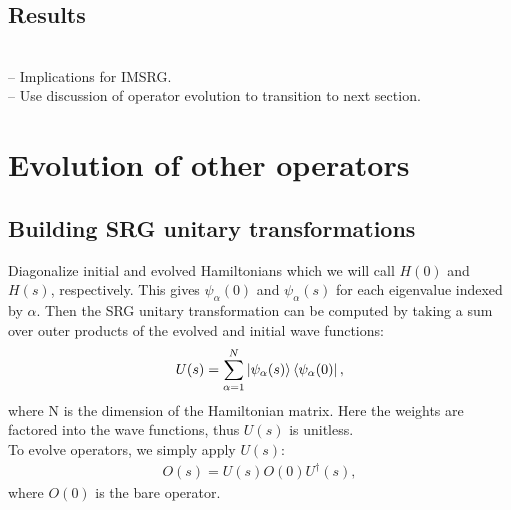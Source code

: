 \documentclass[preprintnumbers,floatfix,aps,prc,preprint,nofootinbib]{revtex4-1}
\begin{document}
\subsection{Results}
\label{sec:magnus_expansion_results}


\\
-- Implications for IMSRG.
\\
-- Use discussion of operator evolution to transition to next section.


\section{Evolution of other operators}
\label{sec:evolution_other_operators}




\subsection{Building SRG unitary transformations}
\label{sec:srg_unitary_transformations}


Diagonalize initial and evolved Hamiltonians which we will call $H(0)$ and $H(s)$, respectively. This gives $\psi_{\alpha}(0)$ and $\psi_{\alpha}(s)$ for each eigenvalue indexed by $\alpha$. Then the SRG unitary transformation can be computed by taking a sum over outer products of the evolved and initial wave functions:
%
\begin{eqnarray}
	\label{eq:unitary_transformation}
	U(s) = \sum_{\alpha=1}^{N} \ket{\psi_{\alpha}(s)} \bra{\psi_{\alpha}(0)},
\end{eqnarray}
%
where N is the dimension of the Hamiltonian matrix. Here the weights are factored into the wave functions, thus $U(s)$ is unitless.
\\

To evolve operators, we simply apply $U(s)$:
%
\begin{eqnarray}
	\label{eq:evolved_operator}
	O(s) = U(s) O(0) U^{\dagger}(s),
\end{eqnarray}
%
where $O(0)$ is the bare operator.
\end{document}
